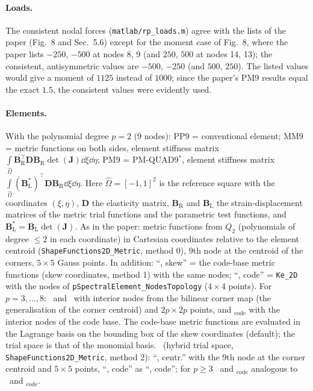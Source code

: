 \documentclass[10pt,a4paper]{article}
\begin{document}
\paragraph{Loads.} The consistent nodal forces (\texttt{matlab/rp\_loads.m}) agree with the
lists of the paper (Fig.~8 and Sec.~5.6) except for the moment case of Fig.~8, where the
paper lists $-250$, $-500$ at nodes 8, 9 (and $250$, $500$ at nodes 14, 13); the consistent,
antisymmetric values are $-500$, $-250$ (and $500$, $250$). The listed values would give a
moment of $1125$ instead of $1000$; since the paper's PM9 results equal the exact $1.5$, the
consistent values were evidently used.

\paragraph{Elements.} With the polynomial degree $p=2$ (9 nodes):
PP9 = conventional element; MM9 = metric functions on both sides, element stiffness matrix
$\int\limits_{\hat\Omega}\bm B_{\mathrm R}^\top\bm D\bm B_{\mathrm R}\det(\bm J)\dd\xi\dd\eta$;
PM9 = PM-QUAD9$^\ast$, element stiffness matrix
$\int\limits_{\hat\Omega}(\bm B_{\mathrm L}^\ast)^\top\bm D\bm B_{\mathrm R}\dd\xi\dd\eta$. Here
$\hat\Omega=[-1,1]^2$ is the reference square with the coordinates $(\xi,\eta)$, $\bm D$ the
elasticity matrix, $\bm B_{\mathrm R}$ and $\bm B_{\mathrm L}$ the strain-displacement matrices of
the metric trial functions and the parametric test functions, and
$\bm B_{\mathrm L}^\ast=\bm B_{\mathrm L}\det(\bm J)$. As in the
paper: metric functions from $Q_2$ (polynomials of degree $\le2$ in each coordinate) in Cartesian
coordinates relative to the element centroid
(\texttt{ShapeFunctions2D\_Metric}, method 0), 9th node at the centroid of the corners,
$5\times5$ Gauss points. In addition: ``\PM, skew'' = the code-base metric functions (skew
coordinates, method 1) with the same nodes; ``\PM, code'' = \texttt{Ke\_2D} with the nodes of
\texttt{pSpectralElement\_NodesTopology} ($4\times4$ points). For $p=3,\dots,8$: \PP\ and \PM\
with interior nodes from the bilinear corner map (the generalisation of the corner centroid)
and $2p\times2p$ points, and \PM$_\mathrm{code}$ with the interior nodes of the code base. The
code-base metric functions are evaluated in the Lagrange basis on the bounding box of the skew
coordinates (default); the trial space is that of the monomial basis. \PH\ (hybrid trial space,
\texttt{ShapeFunctions2D\_Metric}, method 2): ``\PH, centr.'' with the 9th node at the corner
centroid and $5\times5$ points, ``\PH, code'' as ``\PM, code''; for $p\ge3$ \PH\ and
\PH$_\mathrm{code}$ analogous to \PM\ and \PM$_\mathrm{code}$.
\end{document}
